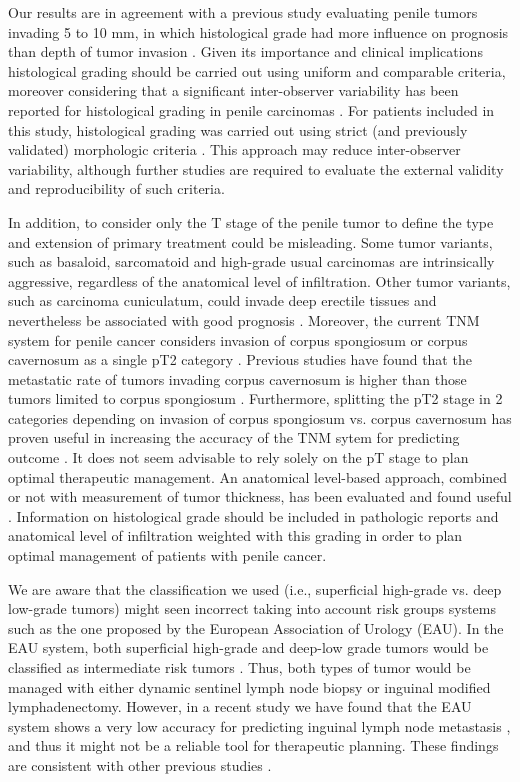 \documentclass[11pt,letterpaper]{article}\usepackage[]{graphicx}\usepackage[]{color}
\begin{document}
\begin{multicols}{2}
Our results are in agreement with a previous study evaluating penile tumors invading 5 to 10 mm, in which histological grade had more influence on prognosis than depth of tumor invasion \cite{Velazquez2008}. Given its importance and clinical implications histological grading should be carried out using uniform and comparable criteria, moreover considering that a significant inter-observer variability has been reported for histological grading in penile carcinomas \cite{Naumann2009}. For patients included in this study, histological grading was carried out using strict (and previously validated) morphologic criteria \cite{Chaux2009b}. This approach may reduce inter-observer variability, although further studies are required to evaluate the external validity and reproducibility of such criteria.

In addition, to consider only the T stage of the penile tumor to define the type and extension of primary treatment could be misleading. Some tumor variants, such as basaloid, sarcomatoid and high-grade usual carcinomas are intrinsically aggressive, regardless of the anatomical level of infiltration\cite{Chaux2009a,Velazquez2005,Guimaraes2009}. Other tumor variants, such as carcinoma cuniculatum, could invade deep erectile tissues and nevertheless be associated with good prognosis \cite{Barreto2007}. Moreover, the current TNM system for penile cancer considers invasion of corpus spongiosum or corpus cavernosum as a single pT2 category \cite{Hakenberg2015}. Previous studies have found that the metastatic rate of tumors invading corpus cavernosum is higher than those tumors limited to corpus spongiosum \cite{Chaux2009}. Furthermore, splitting the pT2 stage in 2 categories depending on invasion of corpus spongiosum vs. corpus cavernosum has proven useful in increasing the accuracy of the TNM sytem for predicting outcome \cite{Leijte2008}. It does not seem advisable to rely solely on the pT stage to plan optimal therapeutic management. An anatomical level-based approach, combined or not with measurement of tumor thickness, has been evaluated and found useful \cite{Chaux2009,Velazquez2008}. Information on histological grade should be included in pathologic reports and anatomical level of infiltration weighted with this grading in order to plan optimal management of patients with penile cancer.

We are aware that the classification we used (i.e., superficial high-grade vs. deep low-grade tumors) might seen incorrect taking into account risk groups systems such as the one proposed by the European Association of Urology (EAU). In the EAU system, both superficial high-grade and deep-low grade tumors would be classified as intermediate risk tumors \cite{Solsona2004}. Thus, both types of tumor would be managed with either dynamic sentinel lymph node biopsy or inguinal modified lymphadenectomy. However, in a recent study we have found that the EAU system shows a very low accuracy for predicting inguinal lymph node metastasis \cite{Chaux2015}, and thus it might not be a reliable tool for therapeutic planning. These findings are consistent with other previous studies \cite{Novara2008}.


\end{multicols}
\end{document}
